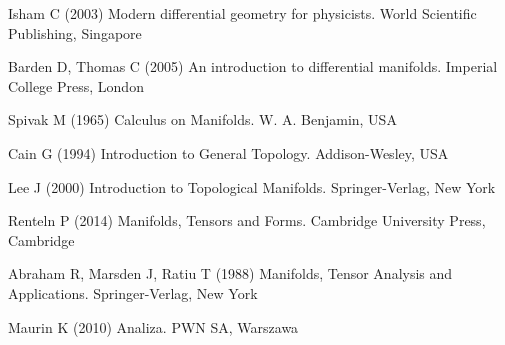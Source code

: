 
%
% 
% 
%
\begin{thebibliography}{99.}
%
%
%
 Isham C (2003)
Modern differential geometry for physicists.
World Scientific Publishing, Singapore

 Barden D, Thomas C (2005)
An introduction to differential manifolds.
Imperial College Press, London

 Spivak M (1965)
Calculus on Manifolds.
W. A. Benjamin, USA

 Cain G (1994)
Introduction to General Topology.
Addison-Wesley, USA

 Lee J (2000)
Introduction to Topological Manifolds.
Springer-Verlag, New York

 Renteln P (2014)
Manifolds, Tensors and Forms.
Cambridge University Press, Cambridge

 Abraham R, Marsden J, Ratiu T (1988)
Manifolds, Tensor Analysis and Applications.
Springer-Verlag, New York

 Maurin K (2010)
Analiza.
PWN SA, Warszawa

%
%

\end{thebibliography}
